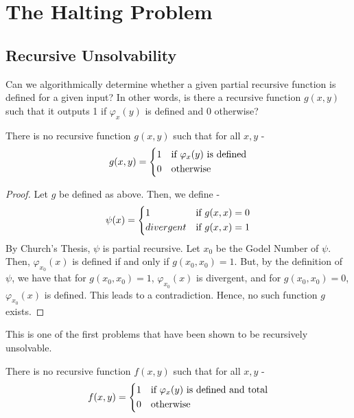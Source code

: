 \documentclass[openany]{book}
\begin{document}
\section{The Halting Problem}
\subsection{Recursive Unsolvability}
Can we algorithmically determine whether a given partial recursive function is defined for a given input? In other words, is there a recursive function $g(x, y)$ such that it outputs 1 if $\varphi_x(y)$ is defined and 0 otherwise? 
\begin{mytheorem}
    There is no recursive function $g(x, y)$ such that for all $x, y$ -
    $$g(x, y) = 
    \begin{dcases}
    1 & \text{if } \varphi_x(y) \text{ is defined} \\
    0 & \text{otherwise}
    \end{dcases}$$
\end{mytheorem}
\begin{proof}
    Let $g$ be defined as above. Then, we define - 
    $$\psi(x) = \begin{dcases}
        1 & \text{if } g(x, x) = 0 \\
        divergent & \text{if } g(x, x) = 1
    \end{dcases}
    $$
    By Church's Thesis, $\psi$ is partial recursive. Let $x_0$ be the Godel Number of $\psi$. Then, $\varphi_{x_0}(x)$ is defined if and only if $g(x_0, x_0) = 1$. But, by the definition of $\psi$, we have that for $g(x_0, x_0) = 1$, $\varphi_{x_0}(x)$ is divergent, and for $g(x_0, x_0) = 0$, $\varphi_{x_0}(x)$ is defined. This leads to a contradiction. Hence, no such function $g$ exists.
\end{proof}
\begin{mynote}
This is one of the first problems that have been shown to be recursively unsolvable.
\end{mynote}
\begin{mytheorem}
    There is no recursive function $f(x, y)$ such that for all $x, y$ -
    $$f(x, y) = 
    \begin{dcases}
    1 & \text{if } \varphi_x(y) \text{ is defined and total} \\
    0 & \text{otherwise}
    \end{dcases}$$
\end{mytheorem}
\end{document}
